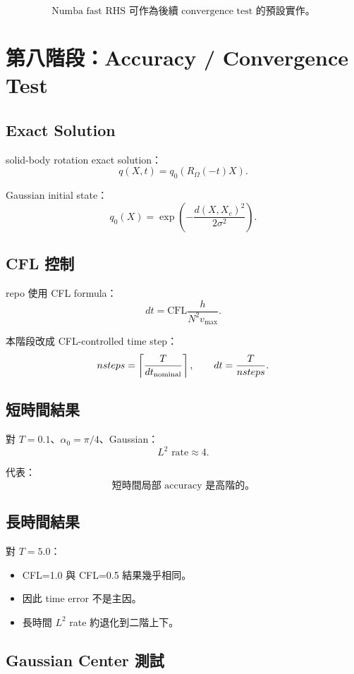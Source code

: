 \documentclass[UTF8,12pt,a4paper]{ctexart}
\begin{document}
\[
\boxed{
\text{Numba fast RHS 可作為後續 convergence test 的預設實作。}
}
\]

\section{第八階段：Accuracy / Convergence Test}

\subsection{Exact Solution}

solid-body rotation exact solution：
\[
q(X,t)=q_0(R_\Omega(-t)X).
\]

Gaussian initial state：
\[
q_0(X)
=
\exp\left(
-\frac{d(X,X_c)^2}{2\sigma^2}
\right).
\]

\subsection{CFL 控制}

repo 使用 CFL formula：
\[
dt
=
\mathrm{CFL}
\frac{h}{N^2v_{\max}}.
\]

本階段改成 CFL-controlled time step：
\[
nsteps=
\left\lceil
\frac{T}{dt_{\rm nominal}}
\right\rceil,
\qquad
dt=\frac{T}{nsteps}.
\]

\subsection{短時間結果}

對 $T=0.1$、$\alpha_0=\pi/4$、Gaussian：
\[
L^2\text{ rate}\approx4.
\]

代表：
\[
\boxed{
\text{短時間局部 accuracy 是高階的。}
}
\]

\subsection{長時間結果}

對 $T=5.0$：
\begin{itemize}
  \item CFL=1.0 與 CFL=0.5 結果幾乎相同。
  \item 因此 time error 不是主因。
  \item 長時間 $L^2$ rate 約退化到二階上下。
\end{itemize}

\subsection{Gaussian Center 測試}
\end{document}
